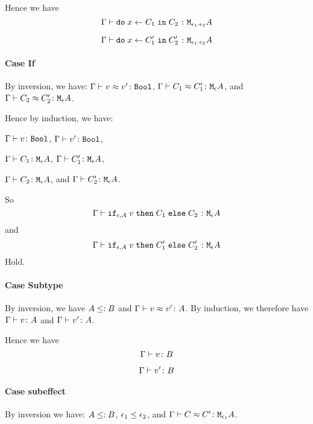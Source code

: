 {    Hence we have 
    \begin{equation}
        \Gamma \vdash \texttt{do}\; x \leftarrow C_1 \;\texttt{in}\; C_2\; \colon \texttt{M}_{\epsilon_1\cdot\epsilon_2}{A}
    \end{equation}

    
    \begin{equation}
        \Gamma \vdash \texttt{do}\; x \leftarrow C_1' \;\texttt{in}\; C_2'\; \colon \texttt{M}_{\epsilon_1\cdot\epsilon_2}{A}
    \end{equation}
\paragraph{Case If}
By inversion, we have:
$\Gamma \vdash v \approx v' \colon \texttt{Bool}$,
$\Gamma \vdash C_1 \approx C_1' \colon \texttt{M}_{\epsilon}{A}$, and
$\Gamma \vdash C_2 \approx C_2' \colon \texttt{M}_{\epsilon}{A}$.

Hence by induction, we have:

$\Gamma \vdash v \colon \texttt{Bool}$,
$\Gamma \vdash v' \colon \texttt{Bool}$,

$\Gamma \vdash C_1 \colon \texttt{M}_{\epsilon}{A}$,
$\Gamma \vdash C_1' \colon \texttt{M}_{\epsilon}{A}$,


$\Gamma \vdash C_2 \colon \texttt{M}_{\epsilon}{A}$, and
$\Gamma \vdash C_2' \colon \texttt{M}_{\epsilon}{A}$.

So 
\begin{equation}
    \Gamma \vdash \texttt{if}_{\epsilon, A}\; v\; \texttt{then}\; C_1 \;\texttt{else} \; C_2\; \colon \texttt{M}_{\epsilon}{A}
\end{equation}
and
\begin{equation}
    \Gamma \vdash \texttt{if}_{\epsilon, A}\; v\; \texttt{then}\; C_1' \;\texttt{else} \; C_2'\; \colon \texttt{M}_{\epsilon}{A}
\end{equation}
Hold.
\paragraph{Case Subtype}

By inversion, we have $A \leq: B$ and $\Gamma \vdash v \approx v' \colon A$. By induction, we therefore have $\Gamma \vdash v \colon A$ and $\Gamma \vdash v' \colon A$.

Hence we have 
\begin{equation}
    \Gamma \vdash v \colon B
\end{equation}


\begin{equation}
    \Gamma \vdash v' \colon B
\end{equation}
\paragraph{Case subeffect}

By inversion we have: $A \leq: B$, $\epsilon_1 \leq \epsilon_2$, and $\Gamma \vdash C \approx C' \colon \texttt{M}_{\epsilon_1}{A}$.

}
